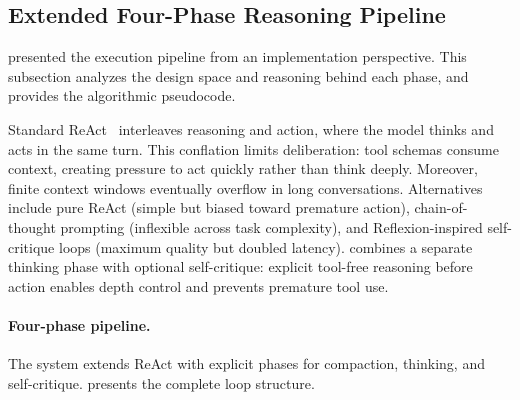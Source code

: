 \subsection{Extended Four-Phase Reasoning Pipeline}
\label{sec:react_loop}

 presented the execution pipeline from an implementation perspective. This subsection analyzes the design space and reasoning behind each phase, and provides the algorithmic pseudocode.

Standard ReAct~\cite{yao2023react} interleaves reasoning and action, where the model thinks and acts in the same turn. This conflation limits deliberation: tool schemas consume context, creating pressure to act quickly rather than think deeply. Moreover, finite context windows eventually overflow in long conversations. Alternatives include pure ReAct (simple but biased toward premature action), chain-of-thought prompting (inflexible across task complexity), and Reflexion-inspired self-critique loops (maximum quality but doubled latency). \name combines a separate thinking phase with optional self-critique: explicit tool-free reasoning before action enables depth control and prevents premature tool use.

\paragraph{Four-phase pipeline.} The system extends ReAct with explicit phases for compaction, thinking, and self-critique.  presents the complete loop structure.

